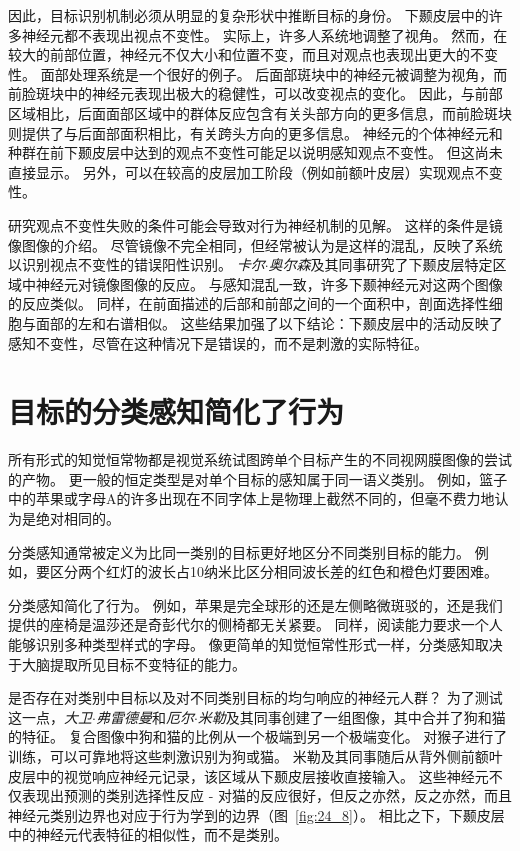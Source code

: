 因此，目标识别机制必须从明显的复杂形状中推断目标的身份。
下颞皮层中的许多神经元都不表现出视点不变性。
实际上，许多人系统地调整了视角。
然而，在较大的前部位置，神经元不仅大小和位置不变，而且对观点也表现出更大的不变性。
面部处理系统是一个很好的例子。
后面部斑块中的神经元被调整为视角，而前脸斑块中的神经元表现出极大的稳健性，可以改变视点的变化。
因此，与前部区域相比，后面面部区域中的群体反应包含有关头部方向的更多信息，而前脸斑块则提供了与后面部面积相比，有关跨头方向的更多信息。
神经元的个体神经元和种群在前下颞皮层中达到的观点不变性可能足以说明感知观点不变性。
但这尚未直接显示。
另外，可以在较高的皮层加工阶段（例如前额叶皮层）实现观点不变性。


研究观点不变性失败的条件可能会导致对行为神经机制的见解。
这样的条件是镜像图像的介绍。
尽管镜像不完全相同，但经常被认为是这样的混乱，反映了系统以识别视点不变性的错误阳性识别。
\textit{卡尔$\cdot$奥尔森}及其同事研究了下颞皮层特定区域中神经元对镜像图像的反应。
与感知混乱一致，许多下颞神经元对这两个图像的反应类似。
同样，在前面描述的后部和前部之间的一个面积中，剖面选择性细胞与面部的左和右谱相似。
这些结果加强了以下结论：下颞皮层中的活动反映了感知不变性，尽管在这种情况下是错误的，而不是刺激的实际特征。



\section{目标的分类感知简化了行为}

所有形式的知觉恒常物都是视觉系统试图跨单个目标产生的不同视网膜图像的尝试的产物。
更一般的恒定类型是对单个目标的感知属于同一语义类别。
例如，篮子中的苹果或字母A的许多出现在不同字体上是物理上截然不同的，但毫不费力地认为是绝对相同的。


分类感知通常被定义为比同一类别的目标更好地区分不同类别目标的能力。
例如，要区分两个红灯的波长占10纳米比区分相同波长差的红色和橙色灯要困难。


分类感知简化了行为。
例如，苹果是完全球形的还是左侧略微斑驳的，还是我们提供的座椅是温莎还是奇彭代尔的侧椅都无关紧要。
同样，阅读能力要求一个人能够识别多种类型样式的字母。
像更简单的知觉恒常性形式一样，分类感知取决于大脑提取所见目标不变特征的能力。


是否存在对类别中目标以及对不同类别目标的均匀响应的神经元人群？
为了测试这一点，\textit{大卫$\cdot$弗雷德曼}和\textit{厄尔$\cdot$米勒}及其同事创建了一组图像，其中合并了狗和猫的特征。
复合图像中狗和猫的比例从一个极端到另一个极端变化。 
对猴子进行了训练，可以可靠地将这些刺激识别为狗或猫。
米勒及其同事随后从背外侧前额叶皮层中的视觉响应神经元记录，该区域从下颞皮层接收直接输入。
这些神经元不仅表现出预测的类别选择性反应 - 对猫的反应很好，但反之亦然，反之亦然，而且神经元类别边界也对应于行为学到的边界（图~\ref{fig:24_8}）。 
相比之下，下颞皮层中的神经元代表特征的相似性，而不是类别。


